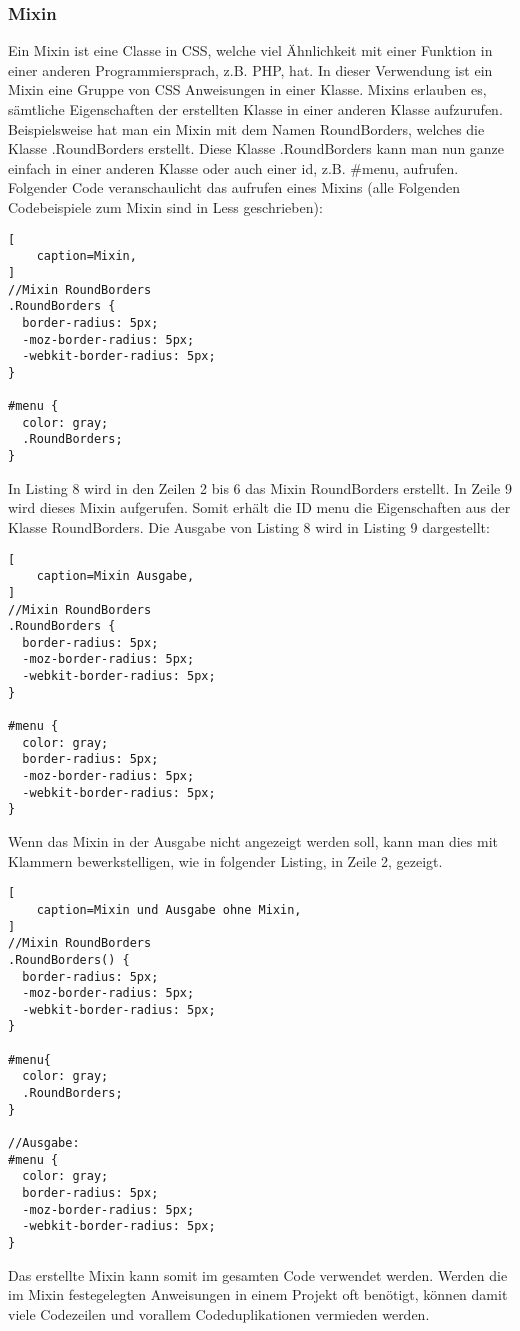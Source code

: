 \subsubsection{Mixin}
Ein Mixin ist eine Classe in CSS, welche viel Ähnlichkeit mit einer Funktion in einer anderen Programmiersprach, z.B. PHP, hat.\newline 
In dieser Verwendung ist ein Mixin eine Gruppe von CSS Anweisungen in einer Klasse. Mixins erlauben es, sämtliche Eigenschaften der erstellten Klasse in einer anderen Klasse aufzurufen.\newline
Beispielsweise hat man ein Mixin mit dem Namen RoundBorders, welches die Klasse .RoundBorders erstellt. Diese Klasse .RoundBorders kann man nun ganze einfach in einer anderen Klasse oder auch einer id, z.B. \#menu, aufrufen.\autocite[]{Gerchev.2012}\newline
Folgender Code veranschaulicht das aufrufen eines Mixins (alle Folgenden Codebeispiele zum Mixin sind in Less geschrieben):
\begin{lstlisting}[
	caption=Mixin,
]
//Mixin RoundBorders
.RoundBorders {
  border-radius: 5px;
  -moz-border-radius: 5px;
  -webkit-border-radius: 5px;
}

#menu {
  color: gray;
  .RoundBorders;
}
\end{lstlisting}
In Listing 8 wird in den Zeilen 2 bis 6 das Mixin RoundBorders erstellt. In Zeile 9 wird dieses Mixin aufgerufen. Somit erhält die ID menu die Eigenschaften aus der Klasse RoundBorders.\newline
Die Ausgabe von Listing 8 wird in Listing 9 dargestellt:
\begin{lstlisting}[
	caption=Mixin Ausgabe,
]
//Mixin RoundBorders
.RoundBorders {
  border-radius: 5px;
  -moz-border-radius: 5px;
  -webkit-border-radius: 5px;
}

#menu {
  color: gray;
  border-radius: 5px;
  -moz-border-radius: 5px;
  -webkit-border-radius: 5px;
}
\end{lstlisting}

Wenn das Mixin in der Ausgabe nicht angezeigt werden soll, kann man dies mit Klammern bewerkstelligen, wie in folgender Listing, in Zeile 2, gezeigt.\autocite[]{thecorelessteam.}\newline
\begin{lstlisting}[
	caption=Mixin und Ausgabe ohne Mixin,
]
//Mixin RoundBorders
.RoundBorders() {
  border-radius: 5px;
  -moz-border-radius: 5px;
  -webkit-border-radius: 5px;
}

#menu{
  color: gray;
  .RoundBorders;
}

//Ausgabe:
#menu {
  color: gray;
  border-radius: 5px;
  -moz-border-radius: 5px;
  -webkit-border-radius: 5px;
}
\end{lstlisting}
Das erstellte Mixin kann somit im gesamten Code verwendet werden. Werden die im Mixin festegelegten Anweisungen in einem Projekt oft benötigt, können damit viele Codezeilen und vorallem Codeduplikationen vermieden werden.

